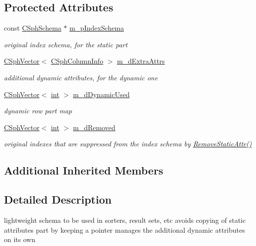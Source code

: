 \subsection*{Protected Attributes}
\begin{DoxyCompactItemize}
\item 
const \hyperlink{classCSphSchema}{C\-Sph\-Schema} $\ast$ \hyperlink{classCSphRsetSchema_a4d588d85d429ecc0db51a8982836008f}{m\-\_\-p\-Index\-Schema}
\begin{DoxyCompactList}\small\item\em original index schema, for the static part \end{DoxyCompactList}\item 
\hyperlink{classCSphVector}{C\-Sph\-Vector}$<$ \hyperlink{structCSphColumnInfo}{C\-Sph\-Column\-Info} $>$ \hyperlink{classCSphRsetSchema_a38ef682d62a173cf4b8c2726d0d5fc68}{m\-\_\-d\-Extra\-Attrs}
\begin{DoxyCompactList}\small\item\em additional dynamic attributes, for the dynamic one \end{DoxyCompactList}\item 
\hyperlink{classCSphVector}{C\-Sph\-Vector}$<$ \hyperlink{sphinxexpr_8cpp_a4a26e8f9cb8b736e0c4cbf4d16de985e}{int} $>$ \hyperlink{classCSphRsetSchema_a21b2acacc1af995cbe7c92af0234f38c}{m\-\_\-d\-Dynamic\-Used}
\begin{DoxyCompactList}\small\item\em dynamic row part map \end{DoxyCompactList}\item 
\hyperlink{classCSphVector}{C\-Sph\-Vector}$<$ \hyperlink{sphinxexpr_8cpp_a4a26e8f9cb8b736e0c4cbf4d16de985e}{int} $>$ \hyperlink{classCSphRsetSchema_a16e7a96c479fe6c94dcebddfaa00fd7a}{m\-\_\-d\-Removed}
\begin{DoxyCompactList}\small\item\em original indexes that are suppressed from the index schema by \hyperlink{classCSphRsetSchema_ae85ee414cc877885d91ad644fc4d98c6}{Remove\-Static\-Attr()} \end{DoxyCompactList}\end{DoxyCompactItemize}
\subsection*{Additional Inherited Members}


\subsection{Detailed Description}
lightweight schema to be used in sorters, result sets, etc avoids copying of static attributes part by keeping a pointer manages the additional dynamic attributes on its own

